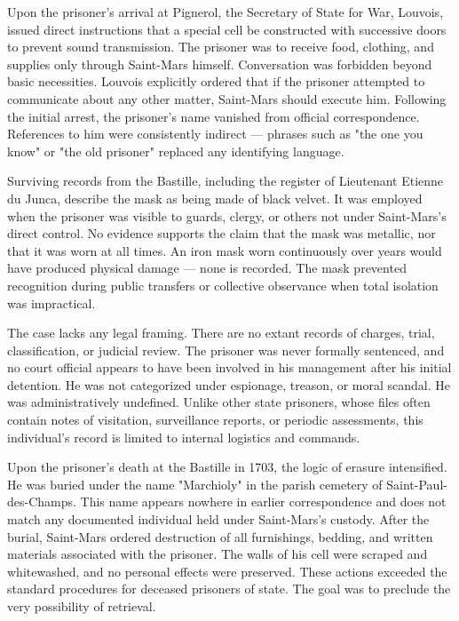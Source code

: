 Upon the prisoner's arrival at Pignerol, the Secretary of State for War, Louvois, issued direct instructions that a special cell be constructed with successive doors to prevent sound transmission. The prisoner was to receive food, clothing, and supplies only through Saint-Mars himself. Conversation was forbidden beyond basic necessities. Louvois explicitly ordered that if the prisoner attempted to communicate about any other matter, Saint-Mars should execute him. Following the initial arrest, the prisoner's name vanished from official correspondence. References to him were consistently indirect — phrases such as "the one you know" or "the old prisoner" replaced any identifying language.

Surviving records from the Bastille, including the register of Lieutenant Etienne du Junca, describe the mask as being made of black velvet. It was employed when the prisoner was visible to guards, clergy, or others not under Saint-Mars's direct control. No evidence supports the claim that the mask was metallic, nor that it was worn at all times. An iron mask worn continuously over years would have produced physical damage — none is recorded. The mask prevented recognition during public transfers or collective observance when total isolation was impractical.

The case lacks any legal framing. There are no extant records of charges, trial, classification, or judicial review. The prisoner was never formally sentenced, and no court official appears to have been involved in his management after his initial detention. He was not categorized under espionage, treason, or moral scandal. He was administratively undefined. Unlike other state prisoners, whose files often contain notes of visitation, surveillance reports, or periodic assessments, this individual's record is limited to internal logistics and commands.

Upon the prisoner's death at the Bastille in 1703, the logic of erasure intensified. He was buried under the name "Marchioly" in the parish cemetery of Saint-Paul-des-Champs. This name appears nowhere in earlier correspondence and does not match any documented individual held under Saint-Mars's custody. After the burial, Saint-Mars ordered destruction of all furnishings, bedding, and written materials associated with the prisoner. The walls of his cell were scraped and whitewashed, and no personal effects were preserved. These actions exceeded the standard procedures for deceased prisoners of state. The goal was to preclude the very possibility of retrieval.

